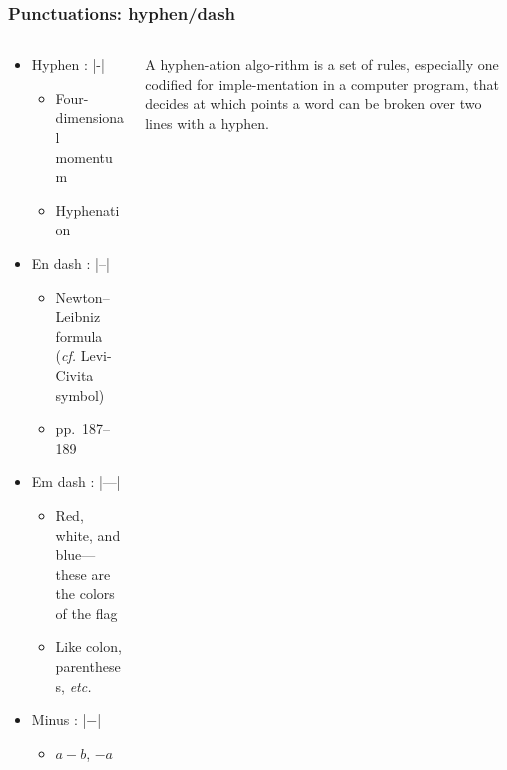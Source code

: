 \begin{frame}[fragile]
\frametitle{Punctuations: hyphen/dash}
\begin{columns}
\begin{column}{0.84\textwidth}
  \begin{itemize}
    \item<1-> Hyphen : |-|
      \begin{itemize}
        \item Four-dimensional momentum
        \item Hyphenation
      \end{itemize}
    \item<3-> En dash : |--|
      \begin{itemize}
        \item Newton--Leibniz formula (\emph{cf.} Levi-Civita symbol)
        \item pp.~187--189
      \end{itemize}
    \item<4-> Em dash : |---|
      \begin{itemize}
        \item Red, white, and blue---these are the colors of the flag
        \item Like colon, parentheses, \emph{etc.}
      \end{itemize}
    \item<5-> Minus : |$-$|
      \begin{itemize}
        \item $a-b$, $-a$
      \end{itemize}
  \end{itemize}
\end{column}
\begin{column}{0.13\textwidth}
  \tiny\RaggedRight
  A hyphen\alert{-}ation algo\alert{-}rithm is a set of rules, especially one codified
  for imple\alert{-}mentation in a computer program, that decides at which points
  a word can be broken over two lines with a hyphen.
\end{column}
\end{columns}
\end{frame}


